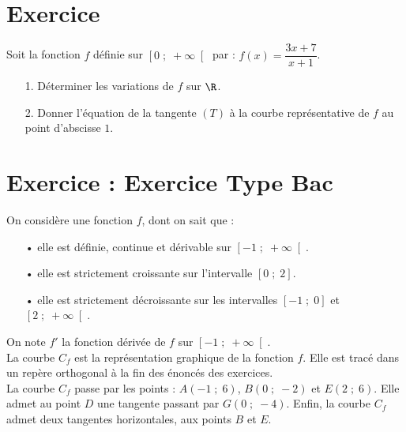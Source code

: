 \section*{Exercice }

Soit la fonction $f$ définie sur $\left[0 \; ; \; +\infty\right[$ par : $f\left(x\right) = \dfrac{3x+7}{x+1}$. \vspace*{.3cm}

\begin{itemize}
\item[1.] Déterminer les variations de $f$ sur $\R$. \\
\item[2.] Donner l'équation de la tangente $\left(T\right)$ à la courbe représentative de $f$ au point d'abscisse $1$. 
\end{itemize}

\newpage

\section*{Exercice  : Exercice Type Bac}

On considère une fonction $f$, dont on sait que :

\begin{itemize}
\item[•] elle est définie, continue et dérivable sur $\left[-1 \; ; \; +\infty\right[$. 
\item[•] elle est strictement croissante sur l'intervalle $\left[0 \; ; \; 2\right]$.
\item[•] elle est strictement décroissante sur les intervalles $\left[-1 \; ; \; 0\right]$ et $\left[2 \; ; \; +\infty\right[$.
\end{itemize}

\vspace*{.3cm}

On note $f'$ la fonction dérivée de $f$ sur $\left[-1 \; ; \; +\infty\right[$. \\

La courbe $C_f$ est la représentation graphique de la fonction $f$. Elle est tracé dans un repère orthogonal à la fin des énoncés des exercices. \\

La courbe $C_f$ passe par les points : $A\left(-1\; ; \; 6\right)$, $B\left(0 \; ; \; -2\right)$ et $E\left(2 \; ; \; 6\right)$. Elle admet au point $D$ une tangente passant par $G\left(0 \; ; \; -4\right)$. Enfin, la courbe $C_f$ admet deux tangentes horizontales, aux points $B$ et $E$. \\

